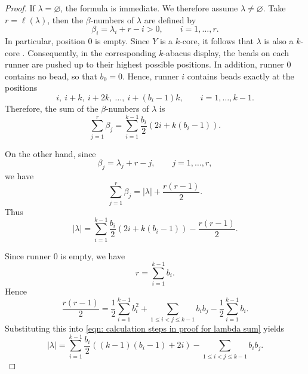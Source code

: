 \documentclass[preprint,3p,10pt]{elsarticle}
\theoremstyle{definition}
\begin{document}
\begin{proof}
If $\lambda=\varnothing$, the formula is immediate. We therefore assume $\lambda\not=\varnothing$. Take $r=\ell(\lambda)$, then the $\beta$-numbers of $\lambda$ are defined by
\begin{equation}
    \beta_i=\lambda_i+r-i>0,\qquad i=1,\dots,r.
\end{equation}
In particular, position \(0\) is empty.
Since $Y$ is a $k$-core, it follows that $\lambda$ is also a $k$-core \cite{gramain2012core}. Consequently, in the corresponding $k$-abacus display, the beads on each runner are pushed up to their highest possible positions. In addition, runner $0$ contains no bead, so that $b_0=0$.
Hence, runner $i$ contains beads exactly at the positions
\begin{equation}
i,\ i+k,\ i+2k,\ \dots,\ i+(b_i-1)k,
\qquad i=1,\dots,k-1.
\end{equation}
Therefore, the sum of the $\beta$-numbers of $\lambda$ is
\begin{equation}
\sum_{j=1}^{r}\beta_j
=
\sum_{i=1}^{k-1}\frac{b_i}{2}\left(2i +k(b_i-1)\right).
\end{equation}

On the other hand, since
\begin{equation}
\beta_j=\lambda_j+r-j,\qquad j=1,\dots,r,
\end{equation}
we have
\begin{equation}
\sum_{j=1}^{r}\beta_j
=
|\lambda|+\frac{r(r-1)}{2}.
\end{equation}
Thus
\begin{equation} \label{eqn: calculation steps in proof for lambda sum}
|\lambda|
=
\sum_{i=1}^{k-1}\frac{b_i}{2}\left(2i +k(b_i-1)\right)-\frac{r(r-1)}{2}.
\end{equation}

Since runner $0$ is empty, we have
\begin{equation}
r=\sum_{i=1}^{k-1}b_i.
\end{equation}
Hence
\begin{equation}
\frac{r(r-1)}{2}
=
\frac{1}{2}\sum_{i=1}^{k-1}b_i^2
+\sum_{1\le i<j\le k-1}b_ib_j
-\frac{1}{2}\sum_{i=1}^{k-1}b_i.
\end{equation}
Substituting this into \eqref{eqn: calculation steps in proof for lambda sum} yields
\begin{equation}
|\lambda|
=
\sum_{i=1}^{k-1} \frac{b_i}{2} \left( (k - 1)(b_i - 1) + 2i \right)
-\sum_{1 \le i < j \le k-1} b_i b_j.
\end{equation}
\end{proof}
\end{document}
